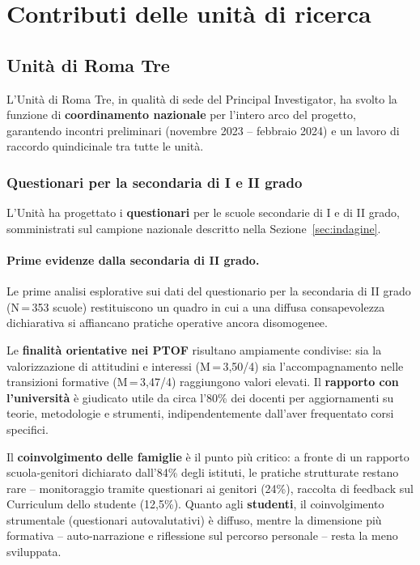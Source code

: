 \documentclass[12pt,a4paper]{article}
\begin{document}
\section{Contributi delle unit\`a di ricerca}

\subsection{Unit\`a di Roma Tre}
\label{sec:roma_tre}

L'Unit\`a di Roma Tre, in qualit\`a di sede del Principal Investigator, ha svolto la funzione di \textbf{coordinamento nazionale} per l'intero arco del progetto, garantendo incontri preliminari (novembre 2023 -- febbraio 2024) e un lavoro di raccordo quindicinale tra tutte le unit\`a.

\subsubsection{Questionari per la secondaria di I e II grado}

L'Unit\`a ha progettato i \textbf{questionari} per le scuole secondarie di I e di II grado, somministrati sul campione nazionale descritto nella Sezione~\ref{sec:indagine}.

\paragraph{Prime evidenze dalla secondaria di II grado.}
Le prime analisi esplorative sui dati del questionario per la secondaria di II grado (N\,=\,353 scuole) restituiscono un quadro in cui a una diffusa consapevolezza dichiarativa si affiancano pratiche operative ancora disomogenee.

Le \textbf{finalit\`a orientative nei PTOF} risultano ampiamente condivise: sia la valorizzazione di attitudini e interessi (M\,=\,3,50/4) sia l'accompagnamento nelle transizioni formative (M\,=\,3,47/4) raggiungono valori elevati. Il \textbf{rapporto con l'universit\`a} \`e giudicato utile da circa l'80\% dei docenti per aggiornamenti su teorie, metodologie e strumenti, indipendentemente dall'aver frequentato corsi specifici.

Il \textbf{coinvolgimento delle famiglie} \`e il punto pi\`u critico: a fronte di un rapporto scuola-genitori dichiarato dall'84\% degli istituti, le pratiche strutturate restano rare -- monitoraggio tramite questionari ai genitori (24\%), raccolta di feedback sul Curriculum dello studente (12,5\%). Quanto agli \textbf{studenti}, il coinvolgimento strumentale (questionari autovalutativi) \`e diffuso, mentre la dimensione pi\`u formativa -- auto-narrazione e riflessione sul percorso personale -- resta la meno sviluppata.
\end{document}
